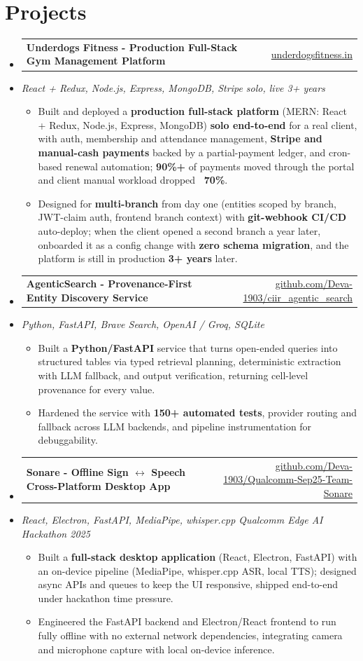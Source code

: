 \documentclass[letterpaper,10pt]{article}
\makeatletter
\newcommand{\resumeItem}[1]{
  \item\small{#1\vspace{-1pt}}
}
\newcommand{\resumeProjectHeading}[2]{
    \item
    \begin{tabular*}{0.985\textwidth}[t]{l@{\extracolsep{\fill}}r}
      \small\textbf{#1} & \small #2 \\
    \end{tabular*}\vspace{-5pt}
}
\newcommand{\resumeProjectSubheading}[1]{
  \vspace{-2pt}\item[] {\small\textcolor{ResumeSlate}{\emph{#1}}}\vspace{-3pt}
}
\newcommand{\resumeSubHeadingListStart}{\begin{itemize}[leftmargin=0.0in, label={}, itemsep=2pt, topsep=2pt]}
\newcommand{\resumeSubHeadingListEnd}{\end{itemize}}
\newcommand{\resumeItemListStart}{\begin{itemize}[leftmargin=0.18in, itemsep=2pt, topsep=1pt]}
\newcommand{\resumeItemListEnd}{\end{itemize}\vspace{-4pt}}
\makeatother
\begin{document}
\section{Projects}
\resumeSubHeadingListStart
  \resumeProjectHeading
    {Underdogs Fitness - Production Full-Stack Gym Management Platform}
    {\href{https://www.underdogsfitness.in}{underdogsfitness.in}}
  \resumeProjectSubheading{React + Redux, Node.js, Express, MongoDB, Stripe \enspace\textbar\enspace solo, live 3+ years}
    \resumeItemListStart
      \resumeItem{Built and deployed a \textbf{production full-stack platform} (MERN: React + Redux, Node.js, Express, MongoDB) \textbf{solo end-to-end} for a real client, with auth, membership and attendance management, \textbf{Stripe and manual-cash payments} backed by a partial-payment ledger, and cron-based renewal automation; \textbf{90\%+} of payments moved through the portal and client manual workload dropped \textbf{~70\%}.}
      \resumeItem{Designed for \textbf{multi-branch} from day one (entities scoped by branch, JWT-claim auth, frontend branch context) with \textbf{git-webhook CI/CD} auto-deploy; when the client opened a second branch a year later, onboarded it as a config change with \textbf{zero schema migration}, and the platform is still in production \textbf{3+ years} later.}
    \resumeItemListEnd
  \resumeProjectHeading
    {AgenticSearch - Provenance-First Entity Discovery Service}
    {\href{https://github.com/Deva-1903/ciir_agentic_search}{github.com/Deva-1903/ciir\_agentic\_search}}
  \resumeProjectSubheading{Python, FastAPI, Brave Search, OpenAI / Groq, SQLite}
    \resumeItemListStart
      \resumeItem{Built a \textbf{Python/FastAPI} service that turns open-ended queries into structured tables via typed retrieval planning, deterministic extraction with LLM fallback, and output verification, returning cell-level provenance for every value.}
      \resumeItem{Hardened the service with \textbf{150+ automated tests}, provider routing and fallback across LLM backends, and pipeline instrumentation for debuggability.}
    \resumeItemListEnd
  \resumeProjectHeading
    {Sonare - Offline Sign \(\leftrightarrow\) Speech Cross-Platform Desktop App}
    {\href{https://github.com/Deva-1903/Qualcomm-Sep25-Team-Sonare}{github.com/Deva-1903/Qualcomm-Sep25-Team-Sonare}}
  \resumeProjectSubheading{React, Electron, FastAPI, MediaPipe, whisper.cpp \enspace\textbar\enspace Qualcomm Edge AI Hackathon 2025}
    \resumeItemListStart
      \resumeItem{Built a \textbf{full-stack desktop application} (React, Electron, FastAPI) with an on-device pipeline (MediaPipe, whisper.cpp ASR, local TTS); designed async APIs and queues to keep the UI responsive, shipped end-to-end under hackathon time pressure.}
      \resumeItem{Engineered the FastAPI backend and Electron/React frontend to run fully offline with no external network dependencies, integrating camera and microphone capture with local on-device inference.}
    \resumeItemListEnd
\resumeSubHeadingListEnd
\vspace{-4pt}
\end{document}
